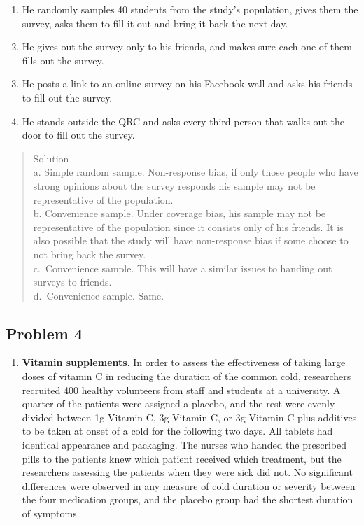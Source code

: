 \documentclass[
]{book}
\providecommand{\tightlist}{%
  \setlength{\itemsep}{0pt}\setlength{\parskip}{0pt}}
\begin{document}
\begin{enumerate}
\def\labelenumi{\alph{enumi}.}
\tightlist
\item
  He randomly samples 40 students from the study's population, gives them the survey, asks them to fill it out and bring it back the next day.\\
\item
  He gives out the survey only to his friends, and makes sure each one of them fills out the survey.\\
\item
  He posts a link to an online survey on his Facebook wall and asks his friends to fill out the survey.\\
\item
  He stands outside the QRC and asks every third person that walks out the door to fill out the survey.
\end{enumerate}

\begin{quote}
Solution\\
a. Simple random sample. Non-response bias, if only those people who have strong opinions about the survey responds his sample may not be representative of the population.\\
b. Convenience sample. Under coverage bias, his sample may not be representative of the population since it consists only of his friends. It is also possible that the study will have non-response bias if some choose to not bring back the survey.\\
c.~Convenience sample. This will have a similar issues to handing out surveys to friends.\\
d.~Convenience sample. Same.
\end{quote}

\pagebreak

\hypertarget{problem-4}{%
\subsection{Problem 4}\label{problem-4}}

\begin{enumerate}
\def\labelenumi{\arabic{enumi}.}
\setcounter{enumi}{3}
\tightlist
\item
  \textbf{Vitamin supplements}. In order to assess the effectiveness of taking large doses of vitamin C in reducing the duration of the common cold, researchers recruited 400 healthy volunteers from staff and students at a university. A quarter of the patients were assigned a placebo, and the rest were evenly divided between 1g Vitamin C, 3g Vitamin C, or 3g Vitamin C plus additives to be taken at onset of a cold for the following two days. All tablets had identical appearance and packaging. The nurses who handed the prescribed pills to the patients knew which patient received which treatment, but the researchers assessing the patients when they were sick did not. No significant differences were observed in any measure of cold duration or severity between the four medication groups, and the placebo group had the shortest duration of symptoms.
\end{enumerate}
\end{document}
